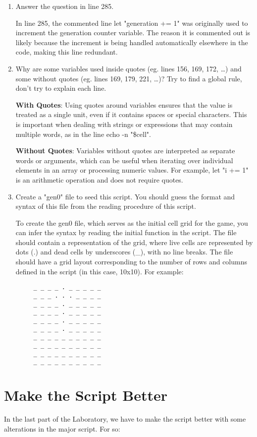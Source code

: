\documentclass[a4paper, 12pt]{article}
\begin{document}
\begin{enumerate}
    \item Answer the question in line 285.
    \par In line 285, the commented line let "generation += 1" was originally used to increment the generation counter variable. The reason it is commented out is likely because the increment is being handled automatically elsewhere in the code, making this line redundant.
    \item Why are some variables used inside quotes (eg. lines 156, 169, 172, …) and some without quotes (eg. lines 169, 179, 221, …)? Try to find a global rule, don’t try to explain each line.
    \par \textbf{With Quotes}: Using quotes around variables ensures that the value is treated as a single unit, even if it contains spaces or special characters. This is important when dealing with strings or expressions that may contain multiple words, as in the line echo -n "\$cell".
    \par \textbf{Without Quotes}: Variables without quotes are interpreted as separate words or arguments, which can be useful when iterating over individual elements in an array or processing numeric values. For example, let "i += 1" is an arithmetic operation and does not require quotes.
    \item Create a "gen0" file to seed this script. You should guess the format and syntax of this file from the reading procedure of this script.
    \par To create the gen0 file, which serves as the initial cell grid for the game, you can infer the syntax by reading the initial function in the script. The file should contain a representation of the grid, where live cells are represented by dots (.) and dead cells by underscores (\_), with no line breaks. The file should have a grid layout corresponding to the number of rows and columns defined in the script (in this case, 10x10). For example:
    \begin{lstlisting}
     _ _ _ _ . _ _ _ _ _
     _ _ _ . . . _ _ _ _
     _ _ _ _ . _ _ _ _ _
     _ _ _ _ . _ _ _ _ _
     _ _ _ _ . _ _ _ _ _
     _ _ _ _ . _ _ _ _ _
     _ _ _ _ _ _ _ _ _ _
     _ _ _ _ _ _ _ _ _ _
     _ _ _ _ _ _ _ _ _ _
     _ _ _ _ _ _ _ _ _ _
    \end{lstlisting}
\end{enumerate}

\section{Make the Script Better}
In the last part of the Laboratory, we have to make the script better with some alterations in the major script. For so:
\end{document}
